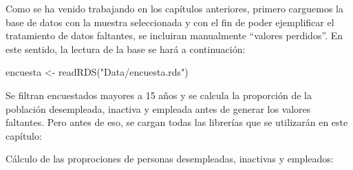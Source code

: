 \documentclass[
  12pt,
]{book}
\newenvironment{Shaded}{\begin{snugshade}}{\end{snugshade}}
\newcommand{\AttributeTok}[1]{\textcolor[rgb]{0.77,0.63,0.00}{#1}}
\newcommand{\CommentTok}[1]{\textcolor[rgb]{0.56,0.35,0.01}{\textit{#1}}}
\newcommand{\ConstantTok}[1]{\textcolor[rgb]{0.00,0.00,0.00}{#1}}
\newcommand{\DecValTok}[1]{\textcolor[rgb]{0.00,0.00,0.81}{#1}}
\newcommand{\FunctionTok}[1]{\textcolor[rgb]{0.00,0.00,0.00}{#1}}
\newcommand{\NormalTok}[1]{#1}
\newcommand{\OtherTok}[1]{\textcolor[rgb]{0.56,0.35,0.01}{#1}}
\newcommand{\SpecialCharTok}[1]{\textcolor[rgb]{0.00,0.00,0.00}{#1}}
\newcommand{\StringTok}[1]{\textcolor[rgb]{0.31,0.60,0.02}{#1}}
\begin{document}
Como se ha venido trabajando en los capítulos anteriores, primero carguemos la base de datos con la muestra seleccionada y con el fin de poder ejemplificar el tratamiento de datos faltantes, se incluiran manualmente ``valores perdidos''. En este sentido, la lectura de la base se hará a continuación:

\begin{Shaded}
\begin{Highlighting}[]
\NormalTok{encuesta }\OtherTok{\textless{}{-}} \FunctionTok{readRDS}\NormalTok{(}\StringTok{"Data/encuesta.rds"}\NormalTok{) }
\end{Highlighting}
\end{Shaded}

Se filtran encuestados mayores a 15 años y se calcula la proporción de la población desempleada, inactiva y empleada antes de generar los valores faltantes. Pero antes de eso, se cargan todas las librerías que se utilizarán en este capítulo:

\begin{Shaded}
\end{Shaded}

Cálculo de las proprociones de personas desempleadas, inactivas y empleados:

\begin{Shaded}
\end{Shaded}
\end{document}
